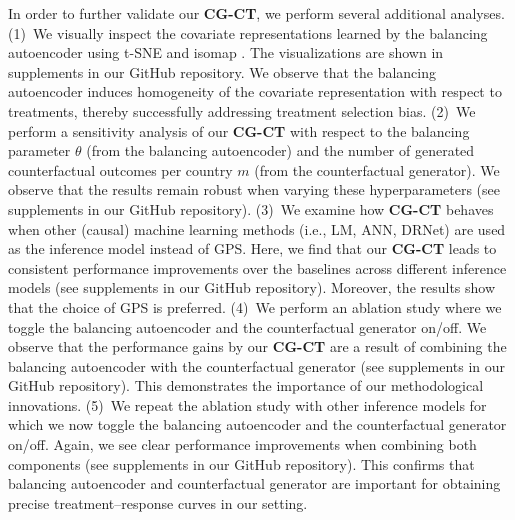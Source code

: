 \documentclass[sigconf]{acmart}
\newcommand{\framework}{\textbf{\mbox{CG-CT}}\xspace}
\begin{document}
In order to further validate our \framework, we perform several additional analyses. (1)~We visually inspect the covariate representations learned by the balancing autoencoder using t-SNE \cite{Maaten2008} and isomap \cite{Tanenbaum2000}. The visualizations are shown in supplements in our GitHub repository. We observe that the balancing autoencoder induces homogeneity of the covariate representation with respect to treatments, thereby successfully addressing treatment selection bias. (2)~We perform a sensitivity analysis of our \framework with respect to the balancing parameter $\theta$ (from the balancing autoencoder) and the number of generated counterfactual outcomes per country $m$ (from the counterfactual generator). We observe that the results remain robust when varying these hyperparameters (see supplements in our GitHub repository). (3)~We examine how \framework behaves when other (causal) machine learning methods (i.e., LM, ANN, DRNet) are used as the inference model instead of GPS. Here, we find that our \framework leads to consistent performance improvements over the baselines across different inference models (see supplements in our GitHub repository). Moreover, the results show that the choice of GPS is preferred. (4)~We perform an ablation study where we toggle the balancing autoencoder and the counterfactual generator on/off. We observe that the performance gains by our \framework are a result of combining the balancing autoencoder with the counterfactual generator (see supplements in our GitHub repository). This demonstrates the importance of our methodological innovations. (5)~We repeat the ablation study with other inference models for which we now toggle the balancing autoencoder and the counterfactual generator on/off. Again, we see clear performance improvements when combining both components (see supplements in our GitHub repository). This confirms that balancing autoencoder and counterfactual generator are important for obtaining precise treatment--response curves in our setting.    
\end{document}
